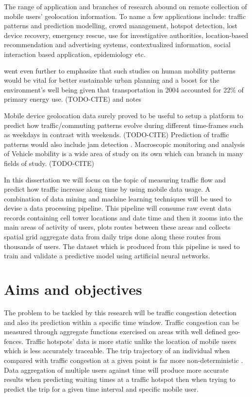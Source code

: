\documentclass[12pt, a4paper]{report}
\theoremstyle{definition}
\theoremstyle{definition}%
\theoremstyle{definition}%
\theoremstyle{definition}%
\theoremstyle{definition}%
\theoremstyle{definition}%
\begin{document}
The range of application and branches of research abound on remote collection of mobile users' geolocation information.   To name a few applications include: traffic patterns and prediction modelling, crowd management, hotspot detection, lost device recovery, emergency rescue, use for investigative authorities,  location-based recommendation and advertising systems, contextualized information, social interaction based application, epidemiology etc.  

\cite{Calabrese2013} went even further to emphasize that such studies on human mobility patterns would be vital for better sustainable urban planning and a boost for the environment's well being given that transportation in 2004 accounted for 22\% of primary energy use. (TODO-CITE) and notes

Mobile device geolocation data surely proved to be useful to setup a platform to predict how traffic/commuting patterns evolve during different time-frames such as weekdays in contrast with weekends. (TODO-CITE) Prediction of traffic patterns would also include jam detection \cite{Hoteit2014}.  Macroscopic monitoring and analysis of Vehicle mobility is a wide area of study on its own which can branch in many fields of study. (TODO-CITE)

In this dissertation we will focus on the topic of measuring traffic flow and predict how traffic increase along time by using mobile data usage. A combination of data mining and machine learning techniques will be used to devise a data processing pipeline. This pipeline will consume raw event data records containing cell tower locations and date time and then it zooms into the main areas of activity of users, plots routes between these areas and collects spatial grid aggregate data from daily trips done along these routes from thousands of users. The dataset which is produced from this pipeline is used to train and validate a predictive model using artificial neural networks.

\section{Aims and objectives}

The problem to be tackled by this research will be traffic congestion detection and also its prediction within a specific time window. Traffic congestion can be measured through aggregate functions exercised on areas with well defined geo-fences. Traffic hotspots' data is more static unlike the location of mobile users which is less accurately traceable. The trip trajectory of an individual when compared with traffic congestion at a given point is far more non-deterministic \cite{Jarv2012}. Data aggregation of multiple users against time will produce more accurate results when predicting waiting times at a traffic hotspot then when trying to predict the trip for a given time interval and specific mobile user.
\end{document}
